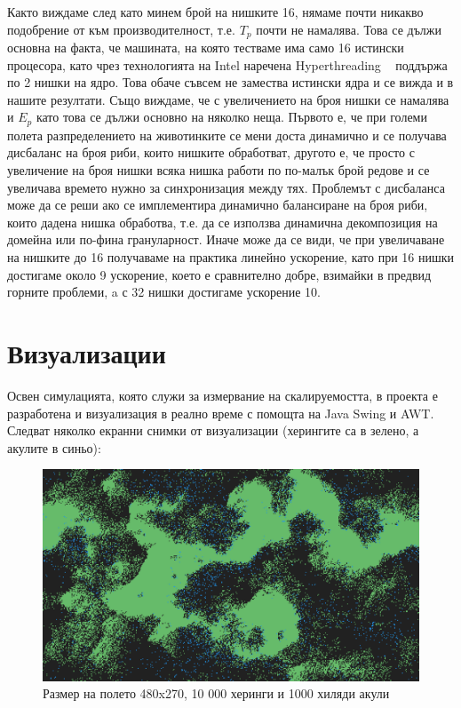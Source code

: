 \documentclass[12pt]{article}
\begin{document}
\bigbreak

Както виждаме след като минем брой на нишките 16, нямаме почти никакво подобрение от към
производителност, т.е. $T_p$ почти не намалява. Това се дължи основна на факта, че машината,
на която тестваме има само 16 истински процесора, като чрез технологията на Intel наречена Hyperthreading ~\cite{hyperthreading}
поддържа по 2 нишки на ядро. Това обаче съвсем не замества истински ядра и се вижда и в нашите резултати.
\bigbreak
Също виждаме, че с увеличението на броя нишки се намалява и $E_p$ като това се дължи основно
на няколко неща. Първото е, че при големи полета разпределението на животинките се мени доста динамично
и се получава дисбаланс на броя риби, които нишките обработват, другото е, че просто с увеличение
на броя нишки всяка нишка работи по по-малък брой редове и се увеличава времето нужно за синхронизация
между тях. Проблемът с дисбаланса може да се реши ако се имплементира динамично балансиране на броя
риби, които дадена нишка обработва, т.е. да се използва динамична декомпозиция на домейна
или по-фина грануларност.
\bigbreak
Иначе може да се види, че при увеличаване на нишките до 16 получаваме на практика линейно ускорение,
като при 16 нишки достигаме около 9 ускорение, което е сравнително добре, взимайки в предвид горните проблеми,
a с 32 нишки достигаме ускорение 10.

\newpage

\section{Визуализации}
Освен симулацията, която служи за измервание на скалируемостта,
в проекта е разработена и визуализация в реално време с помощта на Java Swing и AWT.
Следват няколко екранни снимки от визуализации (херингите са в зелено, а акулите в синьо):

\begin{figure}[H]
	\centering
	\includegraphics[width=1\textwidth]{screenshot-small.png}
	\caption{Размер на полето 480x270, 10 000 херинги и 1000 хиляди акули}
\end{figure}
\end{document}
